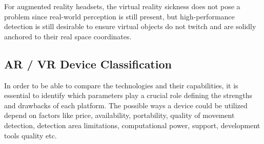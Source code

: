 \documentclass[12pt, a4paper]{article}
\begin{document}
For augmented reality headsets, the virtual reality sickness does not pose a problem since real-world perception is still present, but high-performance detection is still desirable to ensure virtual objects do not twitch and are solidly anchored to their real space coordinates.

\subsection{AR / VR Device Classification}

In order to be able to compare the technologies and their capabilities, it is essential to identify which parameters play a crucial role defining the strengths and drawbacks of each platform. The possible ways a device could be utilized depend on factors like price, availability, portability, quality of movement detection, detection area limitations, computational power, support, development tools quality etc.
\end{document}
